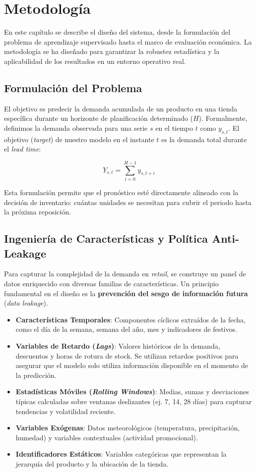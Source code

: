 \chapter{Metodología}
\label{chap:metodologia}

En este capítulo se describe el diseño del sistema, desde la formulación del problema de aprendizaje supervisado hasta el marco de evaluación económica. La metodología se ha diseñado para garantizar la robustez estadística y la aplicabilidad de los resultados en un entorno operativo real.

\section{Formulación del Problema}
El objetivo es predecir la demanda acumulada de un producto en una tienda específica durante un horizonte de planificación determinado ($H$). Formalmente, definimos la demanda observada para una serie $s$ en el tiempo $t$ como $y_{s,t}$. El objetivo (\textit{target}) de nuestro modelo en el instante $t$ es la demanda total durante el \textit{lead time}:

\begin{equation}
    Y_{s,t} = \sum_{i=0}^{H-1} y_{s, t+i}
\end{equation}

Esta formulación permite que el pronóstico esté directamente alineado con la decisión de inventario: cuántas unidades se necesitan para cubrir el periodo hasta la próxima reposición.

\section{Ingeniería de Características y Política Anti-Leakage}
Para capturar la complejidad de la demanda en \textit{retail}, se construye un panel de datos enriquecido con diversas familias de características. Un principio fundamental en el diseño es la \textbf{prevención del sesgo de información futura} (\textit{data leakage}).

\begin{itemize}
    \item \textbf{Características Temporales}: Componentes cíclicos extraídos de la fecha, como el día de la semana, semana del año, mes y indicadores de festivos.
    \item \textbf{Variables de Retardo (\textit{Lags})}: Valores históricos de la demanda, descuentos y horas de rotura de stock. Se utilizan retardos positivos para asegurar que el modelo solo utiliza información disponible en el momento de la predicción.
    \item \textbf{Estadísticas Móviles (\textit{Rolling Windows})}: Medias, sumas y desviaciones típicas calculadas sobre ventanas deslizantes (ej. 7, 14, 28 días) para capturar tendencias y volatilidad reciente.
    \item \textbf{Variables Exógenas}: Datos meteorológicos (temperatura, precipitación, humedad) y variables contextuales (actividad promocional).
    \item \textbf{Identificadores Estáticos}: Variables categóricas que representan la jerarquía del producto y la ubicación de la tienda.
\end{itemize}

